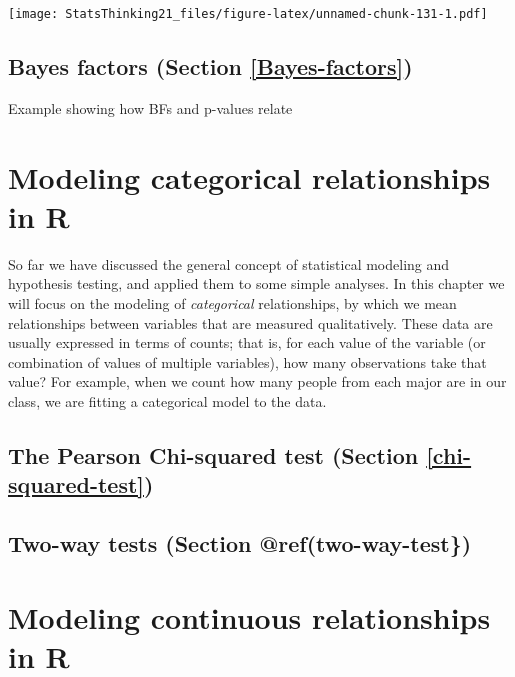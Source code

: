 \documentclass[12pt,]{book}
\begin{document}
\texttt{[image: StatsThinking21\_files/figure-latex/unnamed-chunk-131-1.pdf]}

\hypertarget{bayes-factors-section-refbayes-factors}{%
\section{Bayes factors (Section \ref{Bayes-factors})}\label{bayes-factors-section-refbayes-factors}}

Example showing how BFs and p-values relate

\hypertarget{modeling-categorical-relationships-in-r}{%
\chapter{Modeling categorical relationships in R}\label{modeling-categorical-relationships-in-r}}

So far we have discussed the general concept of statistical modeling and hypothesis testing, and applied them to some simple analyses. In this chapter we will focus on the modeling of \emph{categorical} relationships, by which we mean relationships between variables that are measured qualitatively. These data are usually expressed in terms of counts; that is, for each value of the variable (or combination of values of multiple variables), how many observations take that value? For example, when we count how many people from each major are in our class, we are fitting a categorical model to the data.

\hypertarget{the-pearson-chi-squared-test-section-refchi-squared-test}{%
\section{The Pearson Chi-squared test (Section \ref{chi-squared-test})}\label{the-pearson-chi-squared-test-section-refchi-squared-test}}

\hypertarget{two-way-tests-section-reftwo-way-test}{%
\section{Two-way tests (Section @ref(two-way-test\})}\label{two-way-tests-section-reftwo-way-test}}

\hypertarget{modeling-continuous-relationships-in-r}{%
\chapter{Modeling continuous relationships in R}\label{modeling-continuous-relationships-in-r}}
\end{document}
